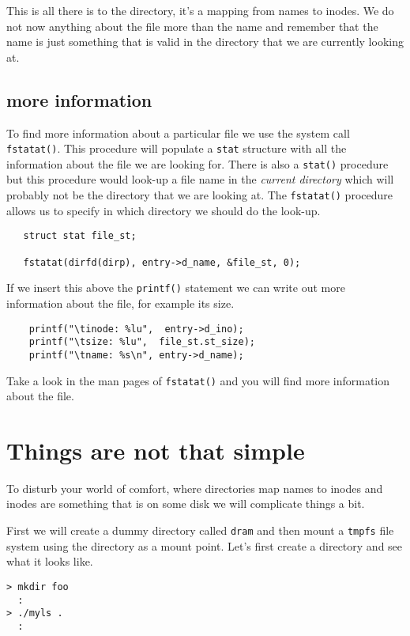 \documentclass[a4paper,11pt]{article}
\begin{document}
This is all there is to the directory, it's a mapping from names to
inodes. We do not now anything about the file more than the name and
remember that the name is just something that is valid in the directory
that we are currently looking at.

\subsection{more information}

To find more information about a particular file we use the system
call {\tt fstatat()}. This procedure will populate a {\tt stat}
structure with all the information about the file we are looking
for. There is also a {\tt stat()} procedure but this procedure would
look-up a file name in the {\em current directory} which will probably
not be the directory that we are looking at. The {\tt fstatat()}
procedure allows us to specify in which directory we should do the look-up. 

\begin{lstlisting}
   struct stat file_st;
 
   fstatat(dirfd(dirp), entry->d_name, &file_st, 0);
\end{lstlisting}

If we insert this above the {\tt printf()} statement we can write out
more information about the file, for example its size. 

\begin{lstlisting}
    printf("\tinode: %lu",  entry->d_ino);
    printf("\tsize: %lu",  file_st.st_size);
    printf("\tname: %s\n", entry->d_name);
 \end{lstlisting}

 Take a look in the man pages of {\tt fstatat()} and you will find
 more information about the file.

\section{Things are not that simple}

To disturb your world of comfort, where directories map names to
inodes and inodes are something that is on some disk we will
complicate things a bit.

First we will create a dummy directory called {\tt dram} and then
mount a {\tt tmpfs} file system using the directory as a mount
point. Let's first create a directory and see what it looks like.

\begin{verbatim}
> mkdir foo
  :
> ./myls .
  :
\end{verbatim}
\end{document}
